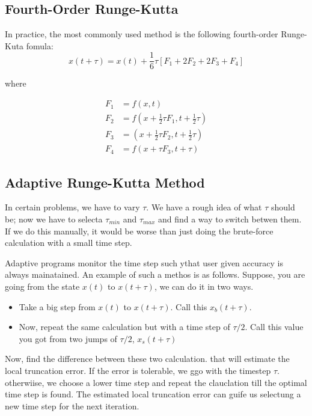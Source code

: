 \documentclass[10pt,a4paper]{article}
\begin{document}
\subsection*{Fourth-Order Runge-Kutta}

In practice, the most commonly used method is the following fourth-order Runge-Kuta fomula:
\begin{equation}
x(t+\tau) = x(t)+\frac{1}{6}\tau[F_1 + 2 F_2 + 2 F_3 + F_4]
\end{equation}

where

\begin{align*}
F_1&=f(x,t)\\
F_2&=f\left(x+\frac{1}{2}\tau F_1,t+\frac{1}{2}\tau \right)\\
F_3&=\left(x+\frac{1}{2}\tau F_2,t+\frac{1}{2}\tau \right)\\
F_4&= f(x+\tau F_3,t+\tau)
\end{align*}

\subsection*{Adaptive Runge-Kutta Method}

In certain problems, we have to vary $\tau$. We have a rough idea of what $\tau$ should be; now we have to selecta $\tau_{min}$ and $\tau_{max}$ and find a way to switch betwen them. If we do this manually, it would be worse than just doing the brute-force calculation with a small time step.

Adaptive programs monitor the time step such ythat user given accuracy is always mainatained. An example of such a methos is as follows. Suppose, you are going from the state $x(t)$ to $x(t+\tau)$, we can do it in two ways.

\begin{itemize}
\item Take a big step from $x(t)$ to $x(t+\tau)$. Call this $x_b(t+\tau)$.
\item Now, repeat the same calculation but with a time step of $\tau/2$. Call this value you got from two jumps of $\tau/2$, $x_s(t+\tau)$
\end{itemize}

Now, find the difference between these two calculation. that will estimate the local truncation error. If the error is tolerable, we ggo with the timestep $\tau$. otherwiise, we choose a lower time step and repeat the clauclation till the optimal time step is found. The estimated local truncation error can guife us selectung a new time step for the next iteration.
\end{document}
